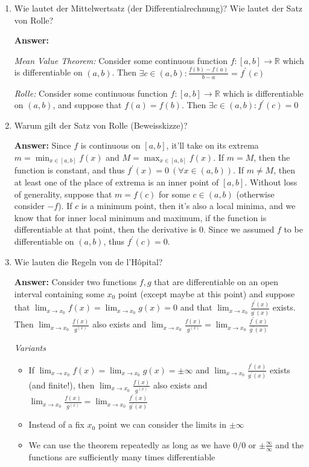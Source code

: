 \documentclass[11pt]{article}
\newcommand{\RR}[0]{\mathbb{R}}
\begin{document}
\begin{enumerate}
    \item Wie lautet der Mittelwertsatz (der Differentialrechnung)? Wie lautet der Satz von
    Rolle?

    \textbf{Answer:}

    \textit{Mean Value Theorem:} Consider some continuous function $f\colon [a, b] \to \RR$ which is differentiable on $(a, b)$. Then $\exists c \in (a, b)\colon \frac{f(b) - f(a)}{b - a} = f^\prime(c)$

    \textit{Rolle:} Consider some continuous function $f\colon [a, b] \to \RR$ which is differentiable on $(a, b)$, and suppose that $f(a) = f(b)$. Then $\exists c\in(a, b)\colon f^\prime(c) = 0$

    \item Warum gilt der Satz von Rolle (Beweisskizze)?
    
    \textbf{Answer:} Since $f$ is continuous on $[a, b]$, it'll take on its extrema $m = \min_{x \in [a, b]}{f(x)}$ and $M = \max_{x \in [a, b]}{f(x)}$. If $m = M$, then the function is constant, and thus $f^\prime(x) = 0~(\forall x\in(a, b))$. If $m \neq M$, then at least one of the place of extrema is an inner point of $[a, b]$. Without loss of generality, suppose that $m = f(c)$ for some $c \in (a, b)$ (otherwise consider $-f$). If $c$ is a minimum point, then it's also a local minima, and we know that for inner local minimum and maximum, if the function is differentiable at that point, then the derivative is $0$. Since we assumed $f$ to be differentiable on $(a, b)$, thus $f^\prime(c) = 0$.

    \item Wie lauten die Regeln von de l'Hôpital?
    
    \textbf{Answer:} Consider two functions $f, g$ that are differentiable on an open interval containing some $x_0$ point (except maybe at this point) and suppose that $\lim_{x \to x_0}f(x) = \lim_{x \to x_0} g(x) = 0$ and that $\lim_{x \to x_0}\frac{f^\prime(x)}{g^\prime(x)}$ exists. Then $\lim_{x \to x_0}\frac{f(x)}{g^(x)}$ also exists and $\lim_{x \to x_0}\frac{f(x)}{g^(x)} = \lim_{x \to x_0}\frac{f^\prime(x)}{g^\prime(x)}$

    \textit{Variants}
    \begin{itemize}
        \item If $\lim_{x \to x_0}f(x) = \lim_{x \to x_0} g(x) = \pm \infty$ and $\lim_{x \to x_0}\frac{f^\prime(x)}{g^\prime(x)}$ exists (and finite!), then $\lim_{x \to x_0}\frac{f(x)}{g^(x)}$ also exists and $\lim_{x \to x_0}\frac{f(x)}{g^(x)} = \lim_{x \to x_0}\frac{f^\prime(x)}{g^\prime(x)}$
        \item Instead of a fix $x_0$ point we can consider the limits in $\pm \infty$
        \item We can use the theorem repeatedly as long as we have $0/0$ or $\pm\frac{\infty}{\infty}$ and the functions are sufficiently many times differentiable
    \end{itemize}


\end{enumerate}
\end{document}
